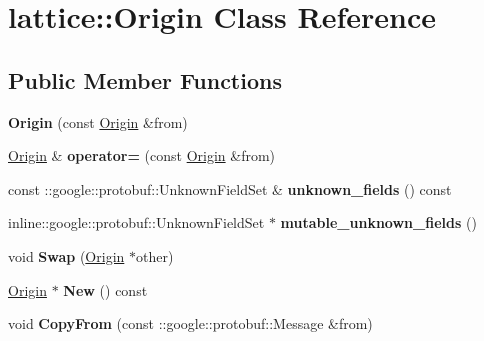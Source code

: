 \hypertarget{classlattice_1_1Origin}{
\section{lattice::Origin Class Reference}
\label{classlattice_1_1Origin}
}
\subsection*{Public Member Functions}
\begin{DoxyCompactItemize}
\item 
\hypertarget{classlattice_1_1Origin_ab55cc18582c3bbc262a924e48697f4cc}{
{\bfseries Origin} (const \hyperlink{classlattice_1_1Origin}{Origin} \&from)}
\label{classlattice_1_1Origin_ab55cc18582c3bbc262a924e48697f4cc}

\item 
\hypertarget{classlattice_1_1Origin_aedeaa82dc76b7d0373cd48f33e028b9e}{
\hyperlink{classlattice_1_1Origin}{Origin} \& {\bfseries operator=} (const \hyperlink{classlattice_1_1Origin}{Origin} \&from)}
\label{classlattice_1_1Origin_aedeaa82dc76b7d0373cd48f33e028b9e}

\item 
\hypertarget{classlattice_1_1Origin_ad520c41793348738a3ac1ebb8f5f1189}{
const ::google::protobuf::UnknownFieldSet \& {\bfseries unknown\_\-fields} () const }
\label{classlattice_1_1Origin_ad520c41793348738a3ac1ebb8f5f1189}

\item 
\hypertarget{classlattice_1_1Origin_a07bec9e32b1ab5ffec8a0fb89f3b593a}{
inline::google::protobuf::UnknownFieldSet $\ast$ {\bfseries mutable\_\-unknown\_\-fields} ()}
\label{classlattice_1_1Origin_a07bec9e32b1ab5ffec8a0fb89f3b593a}

\item 
\hypertarget{classlattice_1_1Origin_a0e3a9e1bbd49641331b067a6dd9e2a8e}{
void {\bfseries Swap} (\hyperlink{classlattice_1_1Origin}{Origin} $\ast$other)}
\label{classlattice_1_1Origin_a0e3a9e1bbd49641331b067a6dd9e2a8e}

\item 
\hypertarget{classlattice_1_1Origin_a8505530533fb46fc7ef7ab26eeb415e6}{
\hyperlink{classlattice_1_1Origin}{Origin} $\ast$ {\bfseries New} () const }
\label{classlattice_1_1Origin_a8505530533fb46fc7ef7ab26eeb415e6}

\item 
\hypertarget{classlattice_1_1Origin_aee8b1f2dd984576e6c73a93d608eb213}{
void {\bfseries CopyFrom} (const ::google::protobuf::Message \&from)}
\label{classlattice_1_1Origin_aee8b1f2dd984576e6c73a93d608eb213}


\end{DoxyCompactItemize}
